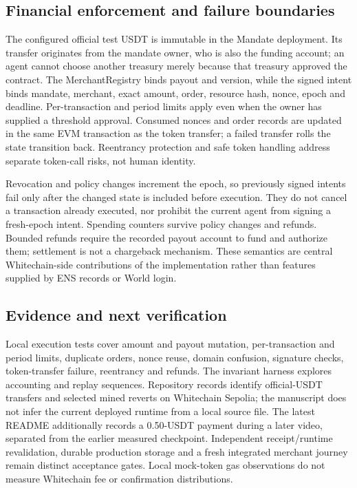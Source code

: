 \documentclass[11pt]{article}
\begin{document}
\subsection{Financial enforcement and failure boundaries}
The configured official test USDT is immutable in the Mandate deployment. Its transfer originates from the mandate owner, who is also the funding account; an agent cannot choose another treasury merely because that treasury approved the contract. The MerchantRegistry binds payout and version, while the signed intent binds mandate, merchant, exact amount, order, resource hash, nonce, epoch and deadline. Per-transaction and period limits apply even when the owner has supplied a threshold approval. Consumed nonces and order records are updated in the same EVM transaction as the token transfer; a failed transfer rolls the state transition back. Reentrancy protection and safe token handling address separate token-call risks, not human identity.

Revocation and policy changes increment the epoch, so previously signed intents fail only after the changed state is included before execution. They do not cancel a transaction already executed, nor prohibit the current agent from signing a fresh-epoch intent. Spending counters survive policy changes and refunds. Bounded refunds require the recorded payout account to fund and authorize them; settlement is not a chargeback mechanism. These semantics are central Whitechain-side contributions of the implementation rather than features supplied by ENS records or World login.

\subsection{Evidence and next verification}
Local execution tests cover amount and payout mutation, per-transaction and period limits, duplicate orders, nonce reuse, domain confusion, signature checks, token-transfer failure, reentrancy and refunds. The invariant harness explores accounting and replay sequences. Repository records identify official-USDT transfers and selected mined reverts on Whitechain Sepolia; the manuscript does not infer the current deployed runtime from a local source file. The latest README additionally records a 0.50-USDT payment during a later video, separated from the earlier measured checkpoint. Independent receipt/runtime revalidation, durable production storage and a fresh integrated merchant journey remain distinct acceptance gates. Local mock-token gas observations do not measure Whitechain fee or confirmation distributions.
\end{document}
